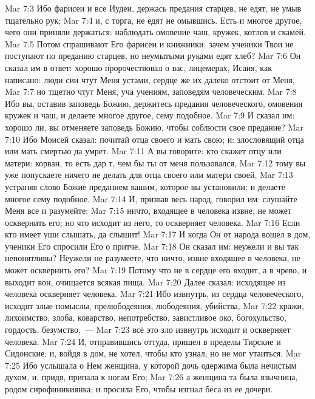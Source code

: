 \vs Mar 7:3 Ибо фарисеи и все Иудеи, держась предания старцев, не едят, не умыв тщательно рук;
\vs Mar 7:4 и,  с торга, не едят не омывшись. Есть и многое другое, чего они приняли держаться: наблюдать омовение чаш, кружек, котлов и скамей.
\vs Mar 7:5 Потом спрашивают Его фарисеи и книжники: зачем ученики Твои не поступают по преданию старцев, но неумытыми руками едят хлеб?
\vs Mar 7:6 Он сказал им в ответ: хорошо пророчествовал о вас, лицемерах, Исаия, как написано: люди сии чтут Меня устами, сердце же их далеко отстоит от Меня,
\vs Mar 7:7 но тщетно чтут Меня, уча учениям, заповедям человеческим.
\vs Mar 7:8 Ибо вы, оставив заповедь Божию, держитесь предания человеческого, омовения кружек и чаш, и делаете многое другое, сему подобное.
\vs Mar 7:9 И сказал им: хорошо ли,  вы отменяете заповедь Божию, чтобы соблюсти свое предание?
\vs Mar 7:10 Ибо Моисей сказал: почитай отца своего и мать свою; и: злословящий отца или мать смертью да умрет.
\vs Mar 7:11 А вы говорите: кто скажет отцу или матери: корван, то есть дар  т, чем бы ты от меня пользовался,
\vs Mar 7:12 тому вы уже попускаете ничего не делать для отца своего или матери своей,
\vs Mar 7:13 устраняя слово Божие преданием вашим, которое вы установили; и делаете многое сему подобное.
\vs Mar 7:14 И, призвав весь народ, говорил им: слушайте Меня все и разумейте:
\vs Mar 7:15 ничто, входящее в человека извне, не может осквернить его; но что исходит из него, то оскверняет человека.
\vs Mar 7:16 Если кто имеет уши слышать, да слышит!
\vs Mar 7:17 И когда Он от народа вошел в дом, ученики Его спросили Его о притче.
\vs Mar 7:18 Он сказал им: неужели и вы так непонятливы? Неужели не разумеете, что ничто, извне входящее в человека, не может осквернить его?
\vs Mar 7:19 Потому что не в сердце его входит, а в чрево, и выходит вон,  очищается всякая пища.
\vs Mar 7:20 Далее сказал: исходящее из человека оскверняет человека.
\vs Mar 7:21 Ибо извнутрь, из сердца человеческого, исходят злые помыслы, прелюбодеяния, любодеяния, убийства,
\vs Mar 7:22 кражи, лихоимство, злоба, коварство, непотребство, завистливое око, богохульство, гордость, безумство,~---
\vs Mar 7:23 всё это зло извнутрь исходит и оскверняет человека.
\rsbpar\vs Mar 7:24 И, отправившись оттуда, пришел в пределы Тирские и Сидонские; и, войдя в дом, не хотел, чтобы кто узнал; но не мог утаиться.
\vs Mar 7:25 Ибо услышала о Нем женщина, у которой дочь одержима была нечистым духом, и, придя, припала к ногам Его;
\vs Mar 7:26 а женщина та была язычница, родом сирофиникиянка; и просила Его, чтобы изгнал беса из ее дочери.

